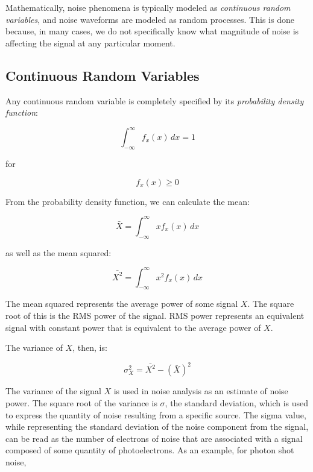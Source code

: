 \documentclass[10pt]{article}
\begin{document}
Mathematically, noise phenomena is typically modeled as \emph{continuous random variables}, and noise waveforms are modeled as random processes. This is done because, in many cases, we do not specifically know what magnitude of noise is affecting the signal at any particular moment.

\subsection{Continuous Random Variables}
\label{sec:contvar}

Any continuous random variable is completely specified by its \emph{probability density function}:

$$\int_{-\infty}^{\infty} f_x(x) \,dx = 1$$

\noindent for

\vspace{-2mm}

$$f_x(x) \ge 0$$

\vspace{2mm}

\noindent From the probability density function, we can calculate the mean:

$$\bar{X} = \int_{-\infty}^{\infty} xf_x(x) \,dx$$

\vspace{2mm}

\noindent as well as the mean squared:

\vspace{-2mm}

$$\bar{X^2} = \int_{-\infty}^{\infty} x^2 f_x(x) \,dx$$

\vspace{2mm}

The mean squared represents the average power of some signal $X$. The square root of this is the RMS power of the signal. RMS power represents an equivalent signal with constant power that is equivalent to the average power of $X$.

The variance of $X$, then, is:

\vspace{-2mm}

$$ \sigma ^2 _X = \bar{X^2} - (\bar{X})^2$$

\vspace{2mm}

\noindent The variance of the signal $X$ is used in noise analysis as an estimate of noise power. The square root of the variance is $\sigma$, the standard deviation, which is used to express the quantity of noise resulting from a specific source. The sigma value, while representing the standard deviation of the noise component from the signal, can be read as the number of electrons of noise that are associated with a signal composed of some quantity of photoelectrons. As an example, for photon shot noise,
\vspace{-2mm}
\end{document}
